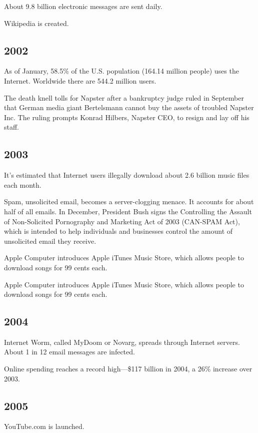 \documentclass[letterpaper,12pt,english]{sphinxmanual}
\begin{document}
About 9.8 billion electronic messages are sent daily.

Wikipedia is created.


\subsection{2002}
\label{network-timeline:id21}
As of January, 58.5\% of the U.S. population (164.14 million people) uses the Internet. Worldwide there are 544.2 million users.

The death knell tolls for Napster after a bankruptcy judge ruled in September that German media giant Bertelsmann cannot buy the assets of troubled Napster Inc. The ruling prompts Konrad Hilbers, Napster CEO, to resign and lay off his staff.


\subsection{2003}
\label{network-timeline:id22}
It's estimated that Internet users illegally download about 2.6 billion music files each month.

Spam, unsolicited email, becomes a server-clogging menace. It accounts for about half of all emails. In December, President Bush signs the Controlling the Assault of Non-Solicited Pornography and Marketing Act of 2003 (CAN-SPAM Act), which is intended to help individuals and businesses control the amount of unsolicited email they receive.

Apple Computer introduces Apple iTunes Music Store, which allows people to download songs for 99 cents each.

Apple Computer introduces Apple iTunes Music Store, which allows people to download songs for 99 cents each.


\subsection{2004}
\label{network-timeline:id23}
Internet Worm, called MyDoom or Novarg, spreads through Internet servers. About 1 in 12 email messages are infected.

Online spending reaches a record high—\$117 billion in 2004, a 26\% increase over 2003.


\subsection{2005}
\label{network-timeline:id24}
YouTube.com is launched.
\end{document}
